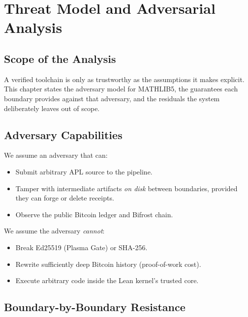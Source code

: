 \chapter{Threat Model and Adversarial Analysis}
\label{ch:threat}

\section{Scope of the Analysis}
\label{sec:threat-scope}

A verified toolchain is only as trustworthy as the assumptions it makes
explicit. This chapter states the adversary model for MATHLIB5, the
guarantees each boundary provides against that adversary, and the residuals
the system deliberately leaves out of scope.

\section{Adversary Capabilities}
\label{sec:threat-adv}

We assume an adversary that can:
\begin{itemize}
  \item Submit arbitrary APL source to the pipeline.
  \item Tamper with intermediate artifacts \emph{on disk} between
        boundaries, provided they can forge or delete receipts.
  \item Observe the public Bitcoin ledger and Bifrost chain.
\end{itemize}
We assume the adversary \emph{cannot}:
\begin{itemize}
  \item Break Ed25519 (Plasma Gate) or SHA-256.
  \item Rewrite sufficiently deep Bitcoin history (proof-of-work cost).
  \item Execute arbitrary code inside the Lean kernel's trusted core.
\end{itemize}

\section{Boundary-by-Boundary Resistance}
\label{sec:threat-bounds}

